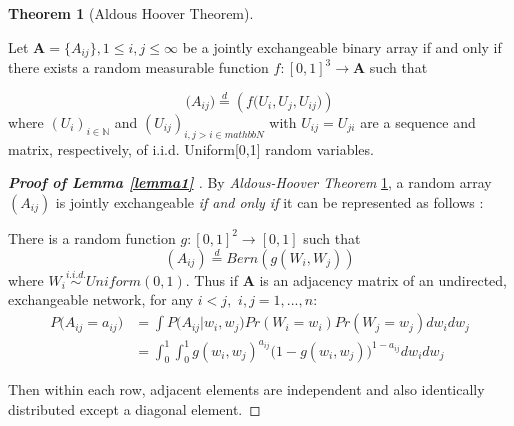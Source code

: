 \documentclass[12pt]{article}
\theoremstyle{definition}
\newtheorem{theorem}{Theorem}[section]
\begin{document}
\begin{theorem}[Aldous Hoover Theorem]
		\label{Aldous_Hoover}
		
		Let $\mathbf{A} = \{A_{ij}\}, 1 \leq i,j \leq \infty$ be a jointly exchangeable binary array if and only if there exists a random measurable function $f : [0,1]^{3} \rightarrow \mathbf{A}$ such that 
		
		\begin{equation}
		\big(  A_{ij}  \big) \stackrel{d}{=} \left( f \big( U_{i}, U_{j}, U_{ij} \big)  \right)
		\end{equation}
		where $(U_{i})_{i \in \mathbb{N}}$ and $(U_{ij})_{i,j > i \in mathbb{N}}$ with $U_{ij} = U_{ji}$ are a sequence and matrix, respectively, of i.i.d. Uniform[0,1] random variables. 
\end{theorem}
	
	
	
\begin{proof}[\textbf{Proof of Lemma \ref{lemma1} }] 
	By \textit{Aldous-Hoover Theorem} \ref{Aldous_Hoover}, a random array $(A_{ij})$ is jointly exchangeable \textit{if and only if} it can be represented as follows : 
		
	There is a random function $g : [0,1]^2 \rightarrow [0,1]$ such that 
\begin{equation}
(A_{ij})  \stackrel{d}{=} Bern( g(W_{i}, W_{j}))
\end{equation}
where $W_{i} \overset{i.i.d.}{\sim} Uniform(0,1)$. Thus if $\mathbf{A}$ is an adjacency matrix of an undirected, exchangeable network, for any $i < j,$ $i,j = 1,... , n$:
\begin{equation}
\begin{split}
	P \big(  A_{ij} = a_{ij} \big) & = \int P \big( A_{ij} \big| w_{i}, w_{j} \big) Pr(W_{i} = w_{i}) Pr(W_{j} = w_{j}) dw_{i} dw_{j} \\ & = \int_{0}^{1} \int_{0}^{1} g( w_{i},  w_{j})^{a_{ij}} \big( 1- g( w_{i},  w_{j}) \big)^{1-a_{ij}} dw_{i} dw_{j} 
\end{split}
\end{equation}
		
Then within each row, adjacent elements are independent and also identically distributed except a diagonal element.

\end{proof}
	
\end{document}
